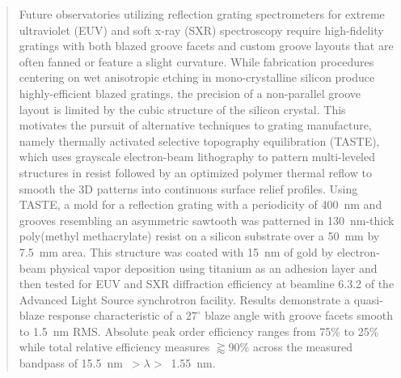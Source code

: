 \documentclass{aastex63}
\begin{document}
\begin{abstract}%
Future observatories utilizing reflection grating spectrometers for extreme ultraviolet (EUV) and soft x-ray (SXR) spectroscopy require high-fidelity gratings with both blazed groove facets and custom groove layouts that are often fanned or feature a slight curvature. 
While fabrication procedures centering on wet anisotropic etching in mono-crystalline silicon produce highly-efficient blazed gratings, the precision of a non-parallel groove layout is limited by the cubic structure of the silicon crystal. 
This motivates the pursuit of alternative techniques to grating manufacture, namely thermally activated selective topography equilibration (TASTE), which uses grayscale electron-beam lithography to pattern multi-leveled structures in resist followed by an optimized polymer thermal reflow to smooth the 3D patterns into continuous surface relief profiles. 
Using TASTE, a mold for a reflection grating with a periodicity of 400~nm and grooves resembling an asymmetric sawtooth was patterned in 130~nm-thick poly(methyl methacrylate) resist on a silicon substrate over a 50~mm by 7.5~mm area. 
This structure was coated with 15~nm of gold by electron-beam physical vapor deposition using titanium as an adhesion layer and then tested for EUV and SXR diffraction efficiency at beamline 6.3.2 of the Advanced Light Source synchrotron facility. 
Results demonstrate a quasi-blaze response characteristic of a $27^{\circ}$ blaze angle with groove facets smooth to 1.5~nm RMS. 
Absolute peak order efficiency ranges from 75\% to 25\% while total relative efficiency measures $\gtrapprox$90\% across the measured bandpass of 15.5~nm~$> \lambda >$~1.55~nm. 
\end{abstract}

\end{document}
